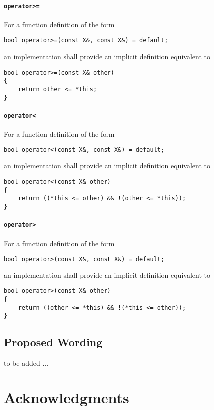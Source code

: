 ﻿\documentclass[a4paper,11pt,final]{article}
\numberwithin{equation}{subsection}
\begin{document}
\paragraph{\texttt{operator>=}}
For a function definition of the form
\begin{verbatim}
bool operator>=(const X&, const X&) = default;
\end{verbatim}
an implementation shall provide an implicit definition equivalent to
\begin{verbatim}
bool operator>=(const X& other)
{
    return other <= *this;
}
\end{verbatim}

\paragraph{\texttt{operator<}}
For a function definition of the form
\begin{verbatim}
bool operator<(const X&, const X&) = default;
\end{verbatim}
an implementation shall provide an implicit definition equivalent to
\begin{verbatim}
bool operator<(const X& other)
{
    return ((*this <= other) && !(other <= *this));
}
\end{verbatim}

\paragraph{\texttt{operator>}}
For a function definition of the form
\begin{verbatim}
bool operator>(const X&, const X&) = default;
\end{verbatim}
an implementation shall provide an implicit definition equivalent to
\begin{verbatim}
bool operator>(const X& other)
{
    return ((other <= *this) && !(*this <= other));
}
\end{verbatim}

\subsection{Proposed Wording}
to be added ...

\section{Acknowledgments}



\end{document}
